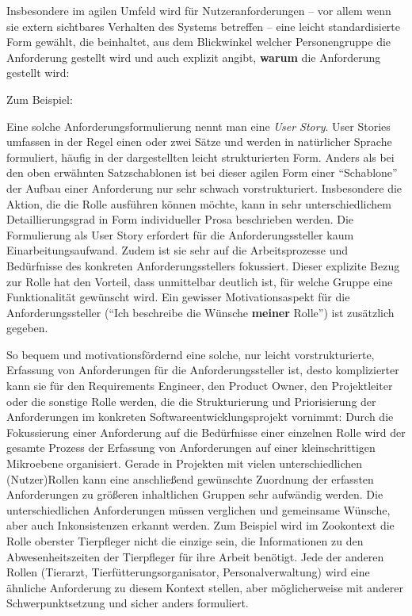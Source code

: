 
Insbesondere im agilen Umfeld wird für Nutzeranforderungen -- vor allem wenn sie extern sichtbares Verhalten des Systems betreffen -- eine leicht standardisierte Form gewählt, die beinhaltet, aus dem Blickwinkel welcher Personengruppe die Anforderung gestellt wird und auch explizit angibt, \textbf{warum} die Anforderung gestellt wird:


Zum Beispiel: 


Eine solche Anforderungsformulierung nennt man eine \textit{User Story}. User Stories umfassen in der Regel einen oder zwei Sätze und werden in natürlicher Sprache formuliert, häufig in der dargestellten leicht strukturierten Form. Anders als bei den oben erwähnten Satzschablonen ist bei dieser agilen Form einer "`Schablone"' der Aufbau einer Anforderung nur sehr schwach vorstrukturiert. Insbesondere die Aktion, die die Rolle ausführen können möchte, kann in sehr unterschiedlichem Detaillierungsgrad in Form individueller Prosa beschrieben werden. Die Formulierung als User Story erfordert für die Anforderungssteller kaum Einarbeitungsaufwand. Zudem ist sie sehr auf die Arbeitsprozesse und Bedürfnisse des konkreten Anforderungsstellers fokussiert. Dieser explizite Bezug zur Rolle hat den Vorteil, dass unmittelbar deutlich ist, für welche Gruppe eine Funktionalität gewünscht wird. Ein gewisser Motivations\-aspekt für die Anforderungssteller ("`Ich beschreibe die Wünsche \textbf{meiner} Rolle"') ist zusätzlich gegeben.

\vspace{2.5mm} %

So bequem und motivationsfördernd eine solche, nur leicht vorstrukturierte, Erfassung von Anforderungen für die Anforderungssteller ist, desto komplizierter kann sie für den Requirements Engineer, den Product Owner, den Projektleiter oder die sonstige Rolle werden, die die Strukturierung und Priorisierung der Anforderungen im konkreten Softwareentwicklungsprojekt vornimmt: Durch die Fokussierung einer Anforderung auf die Bedürfnisse einer einzelnen Rolle wird der gesamte Prozess der Erfassung von Anforderungen auf einer kleinschrittigen Mikroebene organisiert. Gerade in Projekten mit vielen unterschiedlichen (Nutzer)Rollen kann eine anschließend gewünschte Zuordnung der erfassten Anforderungen zu größeren inhaltlichen Gruppen sehr aufwändig werden. Die unterschiedlichen Anforderungen müssen verglichen und gemeinsame Wünsche, aber auch Inkonsistenzen erkannt werden. Zum Beispiel wird im Zookontext die Rolle oberster Tierpfleger nicht die einzige sein, die Informationen zu den Abwesenheitszeiten der Tierpfleger für ihre Arbeit benötigt. Jede der anderen Rollen (\zb Tierarzt, Tierfütterungsorganisator, Personalverwaltung) wird eine ähnliche Anforderung zu diesem Kontext stellen, aber möglicherweise mit anderer Schwerpunktsetzung und sicher anders formuliert.

